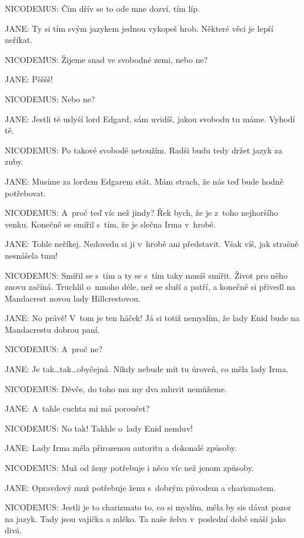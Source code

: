 \noindent
NICODEMUS: Čím dřív se to ode mne dozví, tím líp.

\noindent
JANE: Ty si tím svým jazykem jednou vykopeš hrob. Některé věci je lepší neříkat.

\noindent
NICODEMUS: Žijeme snad ve svobodné zemi, nebo ne?

\noindent
JANE: Pšššš!

\noindent
NICODEMUS: Nebo ne?

\noindent
JANE: Jestli tě uslyší lord Edgard, sám uvidíš, jakou svobodu tu máme. Vyhodí tě.

\noindent
NICODEMUS: Po takové svobodě netoužím. Radši budu tedy držet jazyk za zuby.

\noindent
JANE: Musíme za lordem Edgarem stát. Mám strach, že nás teď bude hodně potřebovat.

\noindent
NICODEMUS: A~proč teď víc než jindy? Řek bych, že je z toho nejhoršího venku. Konečně se smířil s tím, že je slečna Irma v hrobě.

\noindent
JANE: Tohle neříkej. Nedovedu si ji v hrobě ani představit. Však víš, jak strašně nesnášela tmu!

\noindent
NICODEMUS: Smířil se s tím a ty se s tím taky musíš smířit. Život pro něho znovu začíná. Truchlil o~mnoho déle, než se sluší a patří, a konečně si přivedl na Mandacrest novou lady Hillcrestovou.

\noindent
JANE: No právě! V tom je ten háček! Já si totiž nemyslím, že lady Enid bude na Mandacrestu dobrou paní.

\noindent
NICODEMUS: A~proč ne?

\noindent
JANE: Je tak\ldots tak\ldots obyčejná. Nikdy nebude mít tu úroveň, co měla lady Irma.

\noindent
NICODEMUS: Děvče, do toho mu my dva mluvit nemůžeme.

\noindent
JANE: A~tahle cuchta mi má poroučet?

\noindent
NICODEMUS: No tak! Takhle o~lady Enid nemluv!

\noindent
JANE: Lady Irma měla přirozenou autoritu a dokonalé způsoby.

\noindent
NICODEMUS: Muž od ženy potřebuje i něco víc než jenom způsoby.

\noindent
JANE: Opravdový muž potřebuje ženu s dobrým původem a charismatem.

\noindent
NICODEMUS: Jestli je to charizmato to, co si myslím, měla by sis dávat pozor na jazyk. Tady jsou vajíčka a mléko. Ta naše želva v poslední době snáší jako divá.

